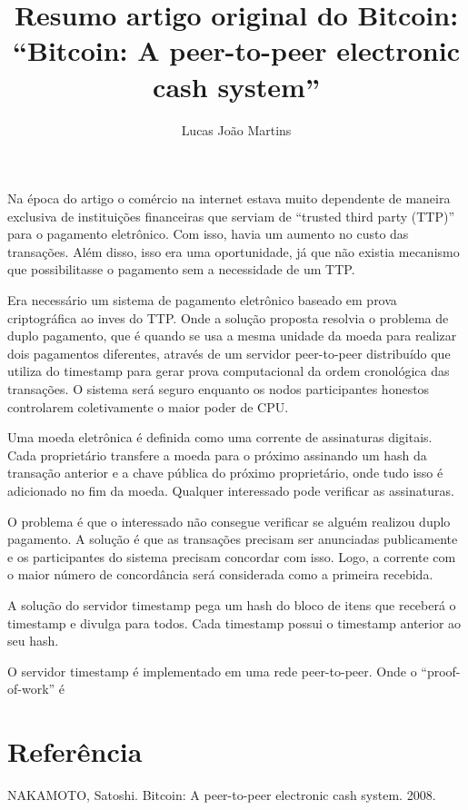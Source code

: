 \documentclass[12pt]{article}
\title{Resumo artigo original do Bitcoin:
    \\
    \large{``Bitcoin: A peer-to-peer electronic cash system''} }
\author{Lucas João Martins}
\date{}
\begin{document}
\maketitle

Na época do artigo o comércio na internet estava muito dependente de maneira
exclusiva de instituições financeiras que serviam de ``trusted third party
(TTP)'' para o pagamento eletrônico. Com isso, havia um aumento no custo das
transações. Além disso, isso era uma oportunidade, já que não existia mecanismo
que possibilitasse o pagamento sem a necessidade de um TTP.

Era necessário um sistema de pagamento eletrônico baseado em prova criptográfica
ao inves do TTP. Onde a solução proposta resolvia o problema de duplo pagamento,
que é quando se usa a mesma unidade da moeda para realizar dois pagamentos
diferentes, através de um servidor peer-to-peer distribuído que utiliza do
timestamp para gerar prova computacional da ordem cronológica das transações. O
sistema será seguro enquanto os nodos participantes honestos controlarem
coletivamente o maior poder de CPU.

Uma moeda eletrônica é definida como uma corrente de assinaturas digitais. Cada
proprietário transfere a moeda para o próximo assinando um hash da transação
anterior e a chave pública do próximo proprietário, onde tudo isso é adicionado
no fim da moeda. Qualquer interessado pode verificar as assinaturas.

O problema é que o interessado não consegue verificar se alguém realizou duplo
pagamento. A solução é que as transações precisam ser anunciadas publicamente e
os participantes do sistema precisam concordar com isso. Logo, a corrente com o
maior número de concordância será considerada como a primeira recebida.

A solução do servidor timestamp pega um hash do bloco de itens que receberá o
timestamp e divulga para todos. Cada timestamp possui o timestamp anterior ao
seu hash.

O servidor timestamp é implementado em uma rede peer-to-peer. Onde o
``proof-of-work'' é


\section*{Referência}
NAKAMOTO, Satoshi. Bitcoin: A peer-to-peer electronic cash system. 2008.
\end{document}
